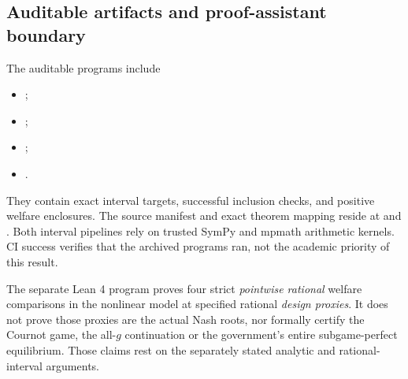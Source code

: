 \subsection{Auditable artifacts and proof-assistant boundary}

The auditable programs include
\begin{itemize}
\item {};
\item {};
\item {};
\item {}.
\end{itemize}
They contain exact interval targets, successful inclusion
checks, and positive welfare enclosures.
The source manifest and exact theorem mapping reside at
 and
.
Both interval pipelines rely on trusted SymPy and mpmath
arithmetic kernels. CI success verifies that the archived
programs ran, not the academic priority of this result.

The separate Lean 4 program
 proves four strict
\emph{pointwise rational} welfare comparisons in the
nonlinear model at specified rational \emph{design proxies}.
It does not prove those proxies are the actual Nash
roots, nor formally certify the Cournot game,
the all-$g$ continuation or the government's entire
subgame-perfect equilibrium. Those claims rest on the
separately stated analytic and rational-interval arguments.

